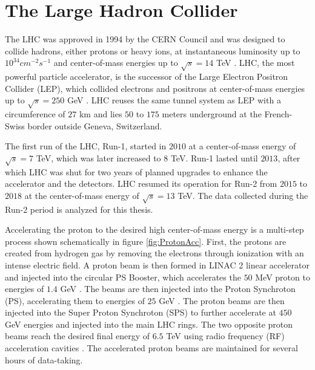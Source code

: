 \section{The Large Hadron Collider}
\label{sec:LHC}

The LHC was approved in 1994 by the CERN Council and was designed to collide hadrons, either protons or heavy ions, at instantaneous luminosity up to $10^{34}cm^{-2}s^{-1}$ and center-of-mass energies up to $\sqrt{s} = 14$ TeV \cite{LHCMachine}. LHC, the most powerful particle accelerator, is the successor of the Large Electron Positron Collider (LEP), which collided electrons and positrons at center-of-mass energies up to $\sqrt{s} = 250$ GeV \cite{LEP}. LHC reuses the same tunnel system as LEP with a circumference of $27$ km and lies $50$ to $175$ meters underground at the French-Swiss border outside Geneva, Switzerland. 

The first run of the LHC, Run-1, started in $2010$ at a center-of-mass energy of $\sqrt{s} = 7$ TeV, which was later increased to $8$ TeV. Run-1 lasted until $2013$, after which LHC was shut for two years of planned upgrades to enhance the accelerator and the detectors. LHC resumed its operation for Run-2 from $2015$ to $2018$ at the center-of-mass energy of $\sqrt{s} = 13$ TeV. The data collected during the Run-2 period is analyzed for this thesis. 

Accelerating the proton to the desired high center-of-mass energy is a multi-step process shown schematically in figure \ref{fig:ProtonAcc}. First, the protons are created from hydrogen gas by removing the electrons through ionization with an intense electric field. A proton beam is then formed in LINAC 2 linear accelerator and injected into the circular PS Booster, which accelerates the $50$ MeV proton to energies of $1.4$ GeV \cite{LHCGuide}. The beams are then injected into the Proton Synchroton (PS), accelerating them to energies of $25$ GeV \cite{LHCGuide}. The proton beams are then injected into the Super Proton Synchroton (SPS) to further accelerate at $450$ GeV energies and injected into the main LHC rings. The two opposite proton beams reach the desired final energy of $6.5$ TeV using radio frequency (RF) acceleration cavities \cite{LHCGuide}. The accelerated proton beams are maintained for several hours of data-taking.

